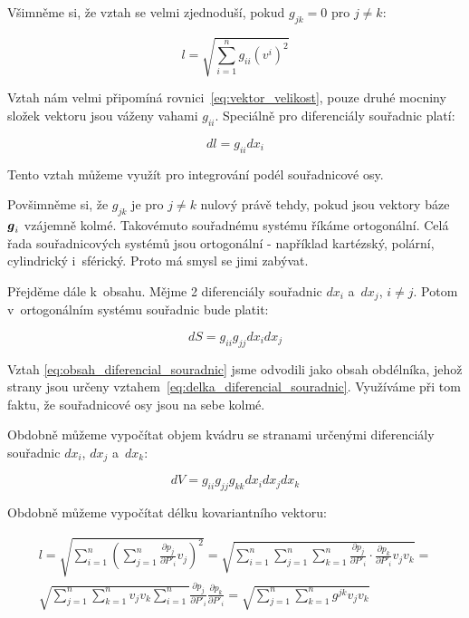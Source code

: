 Všimněme si, že vztah se velmi zjednoduší, pokud \(g_{jk} = 0\) pro \(j \neq k\):

\begin{equation}
l = \sqrt{\sum_{i=1}^n g_{ii} (v^i)^2}
\end{equation}

Vztah nám velmi připomíná rovnici~\eqref{eq:vektor_velikost}, pouze druhé mocniny složek vektoru jsou váženy vahami \(g_{ii}\). Speciálně pro diferenciály souřadnic platí:

\begin{equation}
\label{eq:delka_diferencial_souradnic}
dl = g_{ii} dx_i
\end{equation}

Tento vztah můžeme využít pro integrování podél souřadnicové osy.

Povšimněme si, že \(g_{jk}\) je pro \(j \neq k\) nulový právě tehdy, pokud jsou vektory báze \(\boldsymbol{g}_i\) vzájemně kolmé. Takovémuto souřadnému systému říkáme ortogonální. Celá řada souřadnicových systémů jsou ortogonální - například kartézský, polární, cylindrický i~sférický. Proto má smysl se jimi zabývat.

Přejděme dále k~obsahu. Mějme 2 diferenciály souřadnic \(dx_i\) a~\(dx_j\), \(i \neq j\). Potom v~ortogonálním systému souřadnic bude platit:

\begin{equation}
\label{eq:obsah_diferencial_souradnic}
dS = g_{ii} g_{jj} dx_i dx_j
\end{equation}

Vztah \eqref{eq:obsah_diferencial_souradnic} jsme odvodili jako obsah obdélníka, jehož strany jsou určeny vztahem~\eqref{eq:delka_diferencial_souradnic}. Využíváme při tom faktu, že souřadnicové osy jsou na sebe kolmé.

Obdobně můžeme vypočítat objem kvádru se stranami určenými diferenciály souřadnic \(dx_i\), \(dx_j\) a~\(dx_k\):

\begin{equation}
\label{eq:objem_diferencial_souradnic}
dV = g_{ii} g_{jj} g_{kk} dx_i dx_j dx_k
\end{equation}

Obdobně můžeme vypočítat délku kovariantního vektoru:

\begin{equation}
\begin{split}
l = \sqrt{\sum_{i=1}^n \left(\sum_{j=1}^n \frac{\partial p_j}{\partial P'_i} v_j \right)^2} = \sqrt{\sum_{i=1}^n \sum_{j=1}^n \sum_{k=1}^n \frac{\partial p_j}{\partial P'_i} \cdot \frac{\partial p_k}{\partial P'_i} v_j v_k} = \\
\sqrt{\sum_{j=1}^n \sum_{k=1}^n v_j v_k \sum_{i=1}^n} \frac{\partial p_j}{\partial P'_i} \frac{\partial p_k}{\partial P'_i} = \sqrt{\sum_{j=1}^n \sum_{k=1}^n g^{jk} v_j v_k}
\end{split}
\end{equation}

